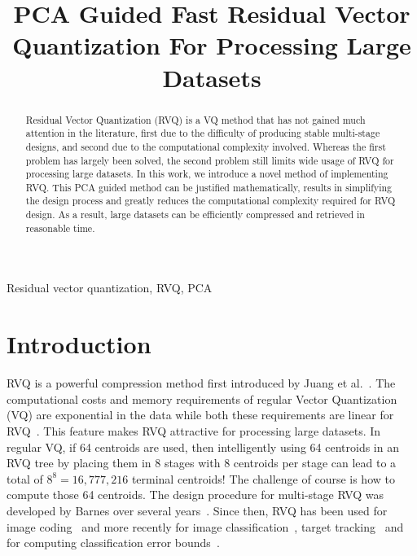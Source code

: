 \documentclass{article}
\title{PCA Guided Fast Residual Vector Quantization For Processing Large Datasets}
\begin{document}
\ninept
\maketitle
\begin{abstract}
Residual Vector Quantization (RVQ) is a VQ method that has not gained much attention in the literature, first due to the difficulty of producing stable multi-stage designs, and second due to the computational complexity involved. Whereas the first problem has largely been solved, the second problem still limits wide usage of RVQ for processing large datasets. In this work, we introduce a novel method of implementing RVQ. This PCA guided method can be justified mathematically, results in simplifying the design process and greatly reduces the computational complexity required for RVQ design. As a result, large datasets can be efficiently compressed and retrieved in reasonable time.
\end{abstract}
%
\begin{keywords}
Residual vector quantization, RVQ, PCA
\end{keywords}

\section{Introduction}
RVQ is a powerful compression method first introduced by Juang et al.~\cite{1982_CNF_SpeechRVQ_JuangGray}.  The computational costs and memory requirements of regular Vector Quantization (VQ) are exponential in the data while both these requirements are linear for RVQ~\cite{1992_JNL_RVQ_Barnes}.  This feature makes RVQ attractive for processing large datasets.  In regular VQ, if 64 centroids are used, then intelligently using 64 centroids in an RVQ tree by placing them in 8 stages with 8 centroids per stage can lead to a total of $8^8=16,777,216$ terminal centroids!  The challenge of course is how to compute those 64 centroids.  The design procedure for multi-stage RVQ was developed by Barnes over several years~\cite{1996_JNL_AdvancesRVQ_Barnes}.  Since then, RVQ has been used for image coding~\cite{1992_CNF_ImageCodingRVQ_Kossentini} and more recently for image classification~\cite{2007_JNL_Katrina_Barnes, 2007_JNL_IDDM_Barnes}, target tracking~\cite{2012_CNF_PhD_Aslam} and for computing  classification error bounds~\cite{2013_THE_classRVQ_Irteza}.  
\end{document}
